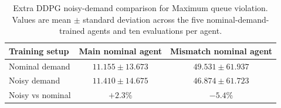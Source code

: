 \begin{table}[htbp]
\centering
\caption{Extra DDPG noisy-demand comparison for Maximum queue violation. Values are mean $\pm$ standard deviation across the five nominal-demand-trained agents and ten evaluations per agent.}
\label{tab:extra_dw_max_comparison}
\begin{tabular}{lcc}
\toprule
Training setup & Main nominal agent & Mismatch nominal agent \\
\midrule
Nominal demand & $11.155 \pm 13.673$ & $49.531 \pm 61.937$ \\
Noisy demand & $11.410 \pm 14.675$ & $46.874 \pm 61.723$ \\
\midrule
Noisy vs nominal & $+2.3\%$ & $-5.4\%$ \\
\bottomrule
\end{tabular}
\end{table}
